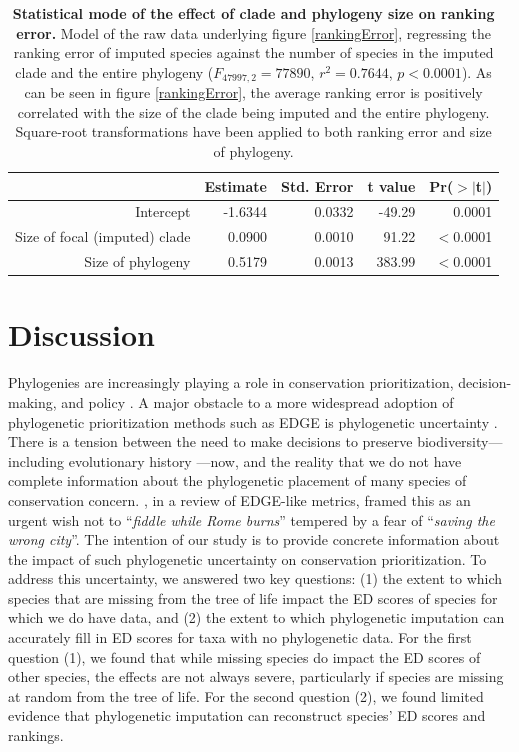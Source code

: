 \documentclass[10pt,english]{article}
\begin{document}
\begin{table}[ht]
  \centering
  \begin{tabular}{rrrrr}
    \hline
   & Estimate & Std. Error & t value & Pr($>$$|$t$|$) \\ \hline
    Intercept & -1.6344 & 0.0332 & -49.29 & 0.0001 \\
    Size of focal (imputed) clade & 0.0900 & 0.0010 & 91.22 & $<$0.0001 \\
    Size of phylogeny & 0.5179 & 0.0013 & 383.99 & $<$0.0001 \\ \hline
  \end{tabular}
  \caption{\textbf{Statistical mode of the effect of clade and
      phylogeny size on ranking error.} Model of the raw data
    underlying figure \ref{rankingError}, regressing the ranking error
    of imputed species against the number of species in the imputed
    clade and the entire phylogeny ($F_{47997,2} = 77890$, $r^2 =
    0.7644$, $p <
    0.0001$). As can be seen in figure \ref{rankingError}, the average
    ranking error is positively correlated with the size of the clade
    being imputed and the entire phylogeny.  Square-root
    transformations have been applied to both ranking error and size
    of phylogeny.}
  \label{impute_rank}
\end{table}

\clearpage
\section*{Discussion}
Phylogenies are increasingly playing a role in conservation prioritization,
decision-making, and policy \autocite{Vezquez1998}. A major obstacle to a more
widespread adoption of phylogenetic prioritization methods such as EDGE is
phylogenetic uncertainty \autocite{Collen2015}. There is a tension between the
need to make decisions to preserve biodiversity---including evolutionary history
---now, and the reality that we do not have complete information about the
phylogenetic placement of many species of conservation concern.
\textcite{Isaac2018}, in a review of EDGE-like metrics, framed this as an urgent
wish not to ``\emph{fiddle while Rome burns}'' tempered by a fear of ``\emph{saving
the wrong city}''. The intention of
our study is to provide concrete information about the impact of such
phylogenetic uncertainty on conservation prioritization. To address this
uncertainty, we answered two key questions: (1) the extent to which species that
are missing from the tree of life impact the ED scores of species for which we
do have data, and (2) the extent to which phylogenetic imputation can accurately
fill in ED scores for taxa with no phylogenetic data. For the first question
(1), we found that while missing species do impact the ED scores of other
species, the effects are not always severe, particularly if species are missing
at random from the tree of life. For the second question (2), we found limited
evidence that phylogenetic imputation can reconstruct species' ED scores and
rankings.
\end{document}
